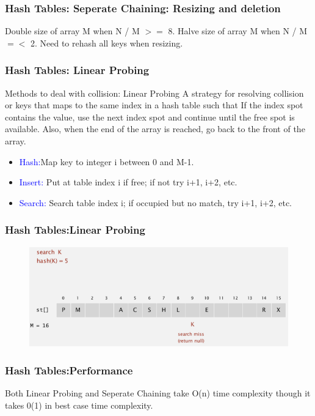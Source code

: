 \documentclass[11pt]{beamer}
\begin{document}
     \begin{frame}
    	\frametitle{Hash Tables: Seperate Chaining: Resizing and deletion}	
		    \alert{ Double size of array M when N / M $>=$ 8. Halve size of array M when N / M $=<$ 2. Need to rehash all keys when resizing.}	
    \end{frame}
 
     \begin{frame}
    	\frametitle{Hash Tables: Linear Probing}	
    	\begin{block}{Methods to deal with collision:  Linear Probing}
    	A strategy for resolving collision or keys that maps to the same index in a hash table such that	If the index spot contains the value, use the next index spot and continue until the free spot is available. Also, when the end of the array is reached, go back to the front of the array.	
    	\end{block}
    
        \begin{itemize}
        	\item \textcolor{blue}{Hash:}Map key to integer i between 0 and M-1.
        	\item \textcolor{blue}{Insert:} Put at table index i if free; if not try i+1, i+2, etc.
         	\item \textcolor{blue}{Search:} Search table index i; if occupied but no match, try i+1, i+2, etc.	 
        \end{itemize}
	
    \end{frame}
   \begin{frame}
   	\frametitle{Hash Tables:Linear Probing}	
   
   	\begin{figure}
   		\centering
   		\includegraphics[width=1.05\linewidth]{"Screenshot 2020-11-29 at 9.17.44 AM"}
   		\label{fig:screenshot-2020-11-29-at-9}
   	\end{figure}  	
   \end{frame}

   \begin{frame}
   	\frametitle{Hash Tables:Performance}	
    \alert{Both Linear Probing and Seperate Chaining take O(n) time complexity though it takes 0(1) in best case time complexity.}
   \end{frame}
\end{document}
